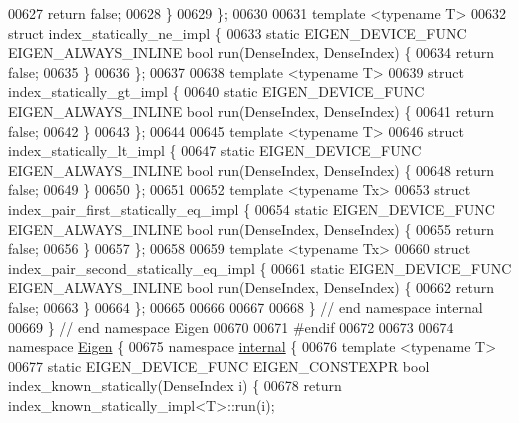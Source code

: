 \begin{DoxyCode}
00627     \textcolor{keywordflow}{return} \textcolor{keyword}{false};
00628   \}
00629 \};
00630 
00631 \textcolor{keyword}{template} <\textcolor{keyword}{typename} T>
00632 \textcolor{keyword}{struct }index\_statically\_ne\_impl \{
00633   \textcolor{keyword}{static} EIGEN\_DEVICE\_FUNC EIGEN\_ALWAYS\_INLINE \textcolor{keywordtype}{bool} run(DenseIndex, DenseIndex) \{
00634     \textcolor{keywordflow}{return} \textcolor{keyword}{false};
00635   \}
00636 \};
00637 
00638 \textcolor{keyword}{template} <\textcolor{keyword}{typename} T>
00639 \textcolor{keyword}{struct }index\_statically\_gt\_impl \{
00640   \textcolor{keyword}{static} EIGEN\_DEVICE\_FUNC EIGEN\_ALWAYS\_INLINE \textcolor{keywordtype}{bool} run(DenseIndex, DenseIndex) \{
00641     \textcolor{keywordflow}{return} \textcolor{keyword}{false};
00642   \}
00643 \};
00644 
00645 \textcolor{keyword}{template} <\textcolor{keyword}{typename} T>
00646 \textcolor{keyword}{struct }index\_statically\_lt\_impl \{
00647   \textcolor{keyword}{static} EIGEN\_DEVICE\_FUNC EIGEN\_ALWAYS\_INLINE \textcolor{keywordtype}{bool} run(DenseIndex, DenseIndex) \{
00648     \textcolor{keywordflow}{return} \textcolor{keyword}{false};
00649   \}
00650 \};
00651 
00652 \textcolor{keyword}{template} <\textcolor{keyword}{typename} Tx>
00653 \textcolor{keyword}{struct }index\_pair\_first\_statically\_eq\_impl \{
00654   \textcolor{keyword}{static} EIGEN\_DEVICE\_FUNC EIGEN\_ALWAYS\_INLINE \textcolor{keywordtype}{bool} run(DenseIndex, DenseIndex) \{
00655     \textcolor{keywordflow}{return} \textcolor{keyword}{false};
00656   \}
00657 \};
00658 
00659 \textcolor{keyword}{template} <\textcolor{keyword}{typename} Tx>
00660 \textcolor{keyword}{struct }index\_pair\_second\_statically\_eq\_impl \{
00661   \textcolor{keyword}{static} EIGEN\_DEVICE\_FUNC EIGEN\_ALWAYS\_INLINE \textcolor{keywordtype}{bool} run(DenseIndex, DenseIndex) \{
00662     \textcolor{keywordflow}{return} \textcolor{keyword}{false};
00663   \}
00664 \};
00665 
00666 
00667 
00668 \}  \textcolor{comment}{// end namespace internal}
00669 \}  \textcolor{comment}{// end namespace Eigen}
00670 
00671 \textcolor{preprocessor}{#endif}
00672 
00673 
00674 \textcolor{keyword}{namespace }\hyperlink{namespace_eigen}{Eigen} \{
00675 \textcolor{keyword}{namespace }\hyperlink{namespaceinternal}{internal} \{
00676 \textcolor{keyword}{template} <\textcolor{keyword}{typename} T>
00677 \textcolor{keyword}{static} EIGEN\_DEVICE\_FUNC EIGEN\_CONSTEXPR \textcolor{keywordtype}{bool} index\_known\_statically(DenseIndex i) \{
00678   \textcolor{keywordflow}{return} index\_known\_statically\_impl<T>::run(i);

\end{DoxyCode}
